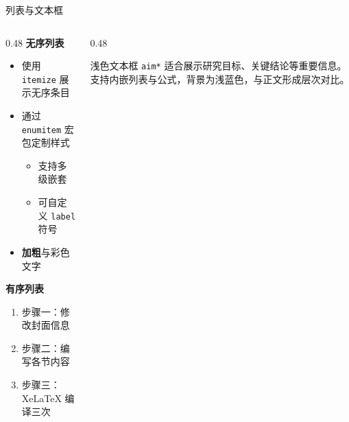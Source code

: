 \documentclass[aspectratio=169]{beamer}
\def\env#1{\texttt{\color{blue}\footnotesize #1}}
\begin{document}
\begin{frame}{列表与文本框}
\begin{columns}[T]
\begin{column}{0.48\textwidth}
\textbf{无序列表}
\begin{itemize}[left=0pt,label=\textcolor{deepblue}{}]
    \item 使用 \env{itemize} 展示无序条目
    \item 通过 \texttt{enumitem} 宏包定制样式
    \begin{itemize}[left=0pt,label=\textcolor{deepblue}{}]
        \item 支持多级嵌套
        \item 可自定义 \texttt{label} 符号
    \end{itemize}
    \item \textbf{加粗}与\textcolor{tsinghua}{彩色}文字
\end{itemize}
\medskip
\textbf{有序列表}
\begin{enumerate}[left=0pt, label=\arabic*.]
    \item 步骤一：修改封面信息
    \item 步骤二：编写各节内容
    \item 步骤三：XeLaTeX 编译三次
\end{enumerate}
\end{column}
\begin{column}{0.48\textwidth}
\begin{aim*}{浅色文本框 \texttt{aim*}}{}
适合展示研究目标、关键结论等重要信息。支持内嵌列表与公式，背景为浅蓝色，与正文形成层次对比。
\end{aim*}
\end{column}
\end{columns}
\end{frame}
\end{document}
